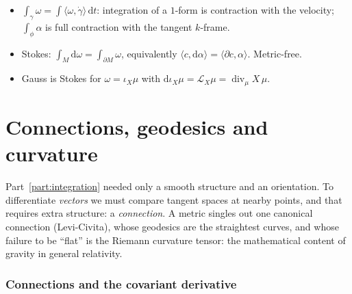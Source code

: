 \documentclass[11pt,a4paper]{article}
\numberwithin{equation}{section}
\theoremstyle{definition}
\theoremstyle{plain}
\newcommand{\dd}{\mathrm{d}}
\newcommand{\Lie}{\mathcal{L}}
\begin{document}
\begin{keypoints}
\begin{itemize}
\item $\int_\gamma\omega=\int\langle\omega,\dot\gamma\rangle\,\dd t$: integration of a $1$-form is contraction with the velocity; $\int_\phi\alpha$ is full contraction with the tangent $k$-frame.
\item Stokes: $\int_M\dd\omega=\int_{\partial M}\omega$, equivalently $\langle c,\dd\alpha\rangle=\langle\partial c,\alpha\rangle$. Metric-free.
\item Gauss is Stokes for $\omega=\iota_X\mu$ with $\dd\iota_X\mu=\Lie_X\mu=\operatorname{div}_\mu X\,\mu$.
\end{itemize}
\end{keypoints}


\clearpage
\part{Connections, geodesics and curvature}\label{part:geometry}

Part~\ref{part:integration} needed only a smooth structure and an orientation. To differentiate \emph{vectors} we must compare tangent spaces at nearby points, and
that requires extra structure: a \emph{connection}. A metric singles out one canonical connection (Levi-Civita), whose geodesics are the straightest curves, and
whose failure to be ``flat'' is the Riemann curvature tensor: the mathematical content of gravity in general relativity.

\section{Connections and the covariant derivative}\label{sec:conn}
\end{document}

